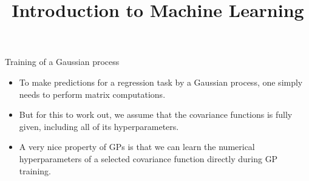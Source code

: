 




\newcommand{\titlefigure}{figure_man/post-variance.png} %
\newcommand{\learninggoals}{
  \item \textcolor{blue}{XXX}
  \item \textcolor{blue}{XXX}
}

\title{Introduction to Machine Learning}
\date{}





\begin{vbframe}{Training of a Gaussian process}

\begin{itemize}
\item To make predictions for a regression task by a Gaussian process, one simply needs to perform matrix computations.
\vspace{.5cm}
\item But for this to work out, we assume that the covariance functions is fully given, including all of its hyperparameters.
\vspace{.5cm}
\item A very nice property of GPs is that we can learn the numerical hyperparameters of a selected covariance function directly during GP training.
\end{itemize}

\end{vbframe}

